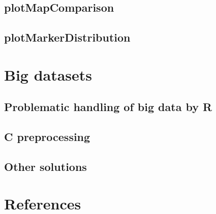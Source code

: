 \documentclass{article}
\begin{document}
\subsection{plotMapComparison}
\blindtext[2]
\subsection{plotMarkerDistribution}
\blindtext[2]
\newpage
\section{Big datasets}
\begin{multicols}{2}
\subsection{Problematic handling of big data by R}
\blindtext
\subsection{C preprocessing}
\blindtext
\subsection{Other solutions}
\blindtext
\end{multicols}
\newpage
\section{References}
\end{document}
